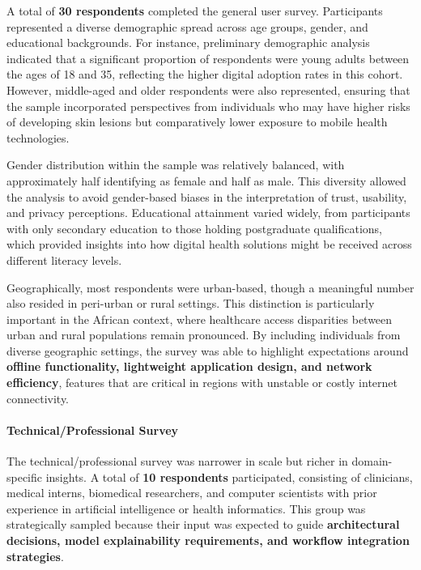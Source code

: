 \documentclass[
  12pt,
  oneside]{article}
\begin{document}
A total of \textbf{30 respondents} completed the general user survey.
Participants represented a diverse demographic spread across age groups,
gender, and educational backgrounds. For instance, preliminary
demographic analysis indicated that a significant proportion of
respondents were young adults between the ages of 18 and 35, reflecting
the higher digital adoption rates in this cohort. However, middle-aged
and older respondents were also represented, ensuring that the sample
incorporated perspectives from individuals who may have higher risks of
developing skin lesions but comparatively lower exposure to mobile
health technologies.

Gender distribution within the sample was relatively balanced, with
approximately half identifying as female and half as male. This
diversity allowed the analysis to avoid gender-based biases in the
interpretation of trust, usability, and privacy perceptions. Educational
attainment varied widely, from participants with only secondary
education to those holding postgraduate qualifications, which provided
insights into how digital health solutions might be received across
different literacy levels.

Geographically, most respondents were urban-based, though a meaningful
number also resided in peri-urban or rural settings. This distinction is
particularly important in the African context, where healthcare access
disparities between urban and rural populations remain pronounced. By
including individuals from diverse geographic settings, the survey was
able to highlight expectations around \textbf{offline functionality,
lightweight application design, and network efficiency}, features that
are critical in regions with unstable or costly internet connectivity.

\paragraph{Technical/Professional
Survey}\label{technicalprofessional-survey}

The technical/professional survey was narrower in scale but richer in
domain-specific insights. A total of \textbf{10 respondents}
participated, consisting of clinicians, medical interns, biomedical
researchers, and computer scientists with prior experience in artificial
intelligence or health informatics. This group was strategically sampled
because their input was expected to guide \textbf{architectural
decisions, model explainability requirements, and workflow integration
strategies}.
\end{document}
